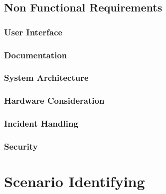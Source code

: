 \documentclass[a4paper]{article}
\begin{document}
\subsection{Non Functional Requirements}
\subsubsection{User Interface}
\subsubsection{Documentation}
\subsubsection{System Architecture}
\subsubsection{Hardware Consideration}
\subsubsection{Incident Handling}
\subsubsection{Security}
\section{Scenario Identifying}
\end{document}

